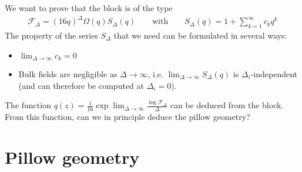 \documentclass[12pt,a4paper]{article}
\begin{document}
We want to prove that the block is of the type 
\begin{align}
 \mathcal{F}_\Delta = (16q)^\Delta \Omega(q)S_\Delta(q) \qquad \text{with} \qquad S_\Delta(q) =  1 + \sum_{k=1}^\infty c_k q^k 
 \label{fd}
\end{align}
The property of the series $S_\Delta$ that we need can be formulated in several ways:
\begin{itemize}
 \item $\lim_{\Delta\to \infty} c_k = 0$
 \item Bulk fields are negligible as $\Delta\to\infty$, i.e. $\lim_{\Delta\to\infty} S_\Delta(q)$ is $\Delta_i$-independent (and can therefore be computed at $\Delta_i=0$). 
\end{itemize}
The function $q(z)= \frac{1}{16} \exp \lim_{\Delta\to \infty} \frac{\log \mathcal{F}_\Delta}{\Delta}$ can be deduced from the block. From this function, can we in principle deduce the pillow geometry?


\section{Pillow geometry}
\end{document}

